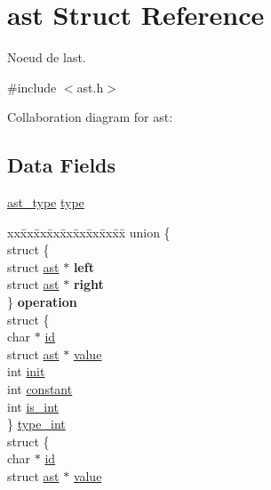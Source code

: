 \hypertarget{structast}{}\section{ast Struct Reference}
\label{structast}


Noeud de l\textquotesingle{}ast.  




{\ttfamily \#include $<$ast.\+h$>$}



Collaboration diagram for ast\+:
\subsection*{Data Fields}
\begin{DoxyCompactItemize}
\item 
\hyperlink{ast_8h_a77091c187ac9a89404fac2e8226daef3}{ast\+\_\+type} \hyperlink{structast_a8321fc8e556a418583dd74ee9fcc2bf7}{type}
\item 
\mbox{\label{structast_aa607c7a27d555cb2310d47623165269a}} 
\begin{tabbing}
xx\=xx\=xx\=xx\=xx\=xx\=xx\=xx\=xx\=\kill
union \{\\
\>struct \{\\
\>\>struct \hyperlink{structast}{ast} $\ast$ {\bfseries left}\\
\>\>struct \hyperlink{structast}{ast} $\ast$ {\bfseries right}\\
\>\} {\bfseries operation}\\
\>struct \{\\
\>\>char $\ast$ \hyperlink{structast_aecb3b0d045ada529257a2fbf8f829599}{id}\\
\>\>struct \hyperlink{structast}{ast} $\ast$ \hyperlink{structast_a0547e48c9f9ecb35c94f988890f217b7}{value}\\
\>\>int \hyperlink{structast_a795ea50921b36311ffd5e7baa2ef1f7e}{init}\\
\>\>int \hyperlink{structast_ac347bb44c6dc857729453831c5714f84}{constant}\\
\>\>int \hyperlink{structast_a43494a3aded0119079bec710b0466621}{is\_int}\\
\>\} \hyperlink{structast_a48c1fea64ccd73c68d3901c23d65f9f5}{type\_int}\\
\>struct \{\\
\>\>char $\ast$ \hyperlink{structast_aecb3b0d045ada529257a2fbf8f829599}{id}\\
\>\>struct \hyperlink{structast}{ast} $\ast$ \hyperlink{structast_a0547e48c9f9ecb35c94f988890f217b7}{value}\\

\end{tabbing}
\end{DoxyCompactItemize}

